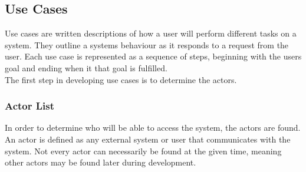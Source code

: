 \subsection{Use Cases}
Use cases are written descriptions of how a user will perform different tasks
on a system. They outline a systems behaviour as it responds to a request from
the user. Each use case is represented as a sequence of steps, beginning with
the users goal and ending when it that goal is fulfilled. \\

The first step in developing use cases is to determine the actors.



\subsubsection{Actor List}
In order to determine who will be able to access the system, the actors are
found. An actor is defined as any external system or user that communicates
with the system. Not every actor can necessarily be found at the given time,
meaning other actors may be found later during development.


